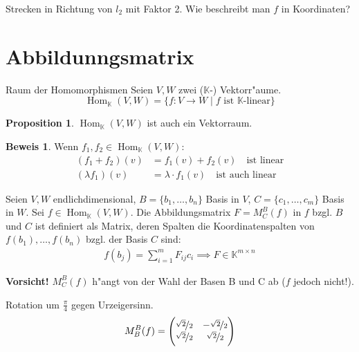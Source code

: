 \documentclass[oneside,fontsize=11pt,paper=a4,BCOR=0mm,DIV=12,automark,headsepline]{scrbook}
\DeclareMathOperator{\mHom}{Hom}
\theoremstyle{remark}
\theoremstyle{definition}
\newtheorem*{proposition}{Proposition}
\theoremstyle{definition}
\newtheorem*{prof}{Beweis}
\theoremstyle{remark}
\begin{document}
\begin{exa}
  Strecken in Richtung von \(l_2\) mit Faktor 2. Wie beschreibt man \(f\) in
  Koordinaten?
\end{exa}

\section{Abbildunngsmatrix}
\begin{definition}{Raum der Homomorphismen}{}
  Seien \(V,W\) zwei (\(\mathbb{K}\)-) Vektorr"aume.
  \[\mHom_\mathbb{K}(V,W) = \{f: V\to W \mid f \text{ ist }\mathbb{K}\text{-linear}\}\]
\end{definition}
\begin{proposition}
  \(\mHom_\mathbb{K}(V,W)\) ist auch ein Vektorraum.
\end{proposition}
\begin{prof}
  Wenn \(f_1, f_2 \in \mHom_\mathbb{K}(V,W)\):
  \begin{align*}
    (f_1 + f_2)(v) &= f_1(v) + f_2(v) \quad\text{ist linear} \\
    (\lambda f_1)(v) &= \lambda\cdot f_1(v)\quad\text{ist auch linear}
  \end{align*}
\end{prof}

Seien \(V, W\) endlichdimensional, \(B = \{b_1, \dots, b_n\}\) Basis in \(V\), \(C = \{c_1, \dots, c_m\}\) Basis in \(W\). Sei \(f \in \mHom_\mathbb{K}(V,W)\). Die Abbildungsmatrix \(F= M_C^B(f)\) in \(f\) bzgl. \(B\) und \(C\) ist definiert als
Matrix, deren Spalten die Koordinatenspalten von \(f(b_1),\dots, f(b_n)\) bzgl. der Basis \(C\) sind:
\begin{align*}
  f(b_j) = \sum_{i=1}^mF_{ij}c_i \implies F \in \mathbb{K}^{m\times n}
\end{align*}

\textbf{Vorsicht!} \(M_C^B(f)\) h"angt von der Wahl der Basen B und C ab (\(f\) jedoch nicht!).

\begin{exa}
  Rotation um \(\frac{\pi}{4}\) gegen Urzeigersinn.
  \begin{align*}
    M_B^B(f) = \begin{pmatrix}
      \nicefrac{\sqrt{2}}{2} & -\nicefrac{\sqrt{2}}{2}\\
      \nicefrac{\sqrt{2}}{2} & \nicefrac{\sqrt{2}}{2}
    \end{pmatrix}
  \end{align*}
\end{exa}
\end{document}

